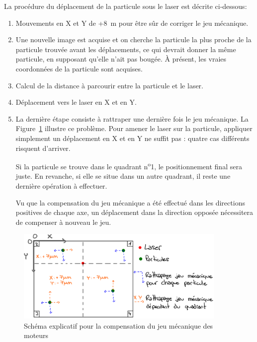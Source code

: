 La procédure du déplacement de la particule sous le laser est décrite ci-dessous:
\begin{enumerate}
    \item Mouvements en X et Y de +8~\textmu m pour être sûr de corriger le jeu mécanique.
    \item Une nouvelle image est acquise et on cherche la particule la plus proche de la particule trouvée avant les déplacements, ce qui devrait donner la même particule, en supposant qu'elle n'ait pas bougée. À présent, les vraies coordonnées de la particule sont acquises.
    \item Calcul de la distance à parcourir entre la particule et le laser.
    \item Déplacement vers le laser en X et en Y.
    \item
          La dernière étape consiste à rattraper une dernière fois le jeu mécanique. La Figure~\ref{schema_explicatif_jeu} illustre ce problème. Pour amener le laser sur la particule, appliquer simplement un déplacement en X et en Y ne suffit pas :  quatre cas différents risquent d'arriver.

          Si la particule se trouve dans le quadrant n\textsuperscript{o}1, le positionnement final sera juste. En revanche, si elle se situe dans un autre quadrant, il reste une dernière opération à effectuer.

          Vu que la compensation du jeu mécanique a été effectué dans les directions positives de chaque axe, un déplacement dans la direction opposée nécessitera de compenser à nouveau le jeu.

\end{enumerate}
\begin{figure}[H]
    \centering
    \includegraphics[width=0.9\textwidth]{assets/figures/Application_ServoVision/Schema_explicatif_jeu_mecanique.jpeg}
    \caption{Schéma explicatif pour la compensation du jeu mécanique des moteurs}
    \label{schema_explicatif_jeu}
\end{figure}

